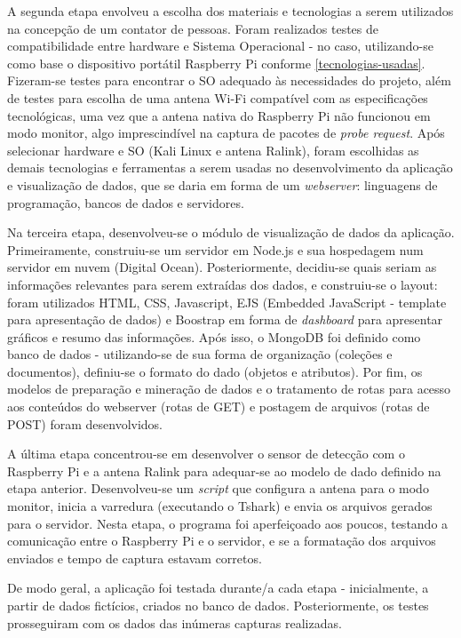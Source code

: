 A segunda etapa envolveu a escolha dos materiais e tecnologias a serem
utilizados na concepção de um contator de pessoas. Foram realizados testes de
compatibilidade entre hardware e Sistema Operacional - no caso, utilizando-se
como base o dispositivo portátil Raspberry Pi conforme
\autoref{tecnologias-usadas}. Fizeram-se testes para encontrar o SO adequado às
necessidades do projeto, além de testes para escolha de uma antena Wi-Fi
compatível com as especificações tecnológicas, uma vez que a antena nativa do
Raspberry Pi não funcionou em modo monitor, algo imprescindível na captura de
pacotes de \emph{probe request}. Após selecionar hardware e SO (Kali Linux e antena Ralink), foram escolhidas as demais
tecnologias e ferramentas a serem usadas no desenvolvimento da aplicação e
visualização de dados, que se daria em forma de um \emph{webserver}: linguagens
de programação, bancos de dados e servidores.

Na terceira etapa, desenvolveu-se o módulo de visualização de dados da aplicação.
Primeiramente, construiu-se um servidor em Node.js e sua hospedagem num servidor em nuvem (Digital Ocean). Posteriormente, decidiu-se quais seriam as informações relevantes para serem extraídas dos dados, e construiu-se o layout: foram utilizados HTML, CSS, Javascript, EJS (Embedded
JavaScript - template para apresentação de dados) e Boostrap em forma de
\emph{dashboard} para apresentar gráficos e resumo das informações. Após isso, o
MongoDB foi definido como banco de dados - utilizando-se de sua forma de
organização (coleções e documentos), definiu-se o formato do dado (objetos e
atributos). Por fim, os modelos de preparação e mineração  de dados e o
tratamento de rotas para acesso aos conteúdos do webserver (rotas de GET) e
postagem de arquivos (rotas de POST) foram desenvolvidos.

A última etapa concentrou-se em desenvolver o sensor de detecção com o
Raspberry Pi e a antena Ralink para adequar-se ao modelo de dado definido na
etapa anterior. Desenvolveu-se um \emph{script} que configura a antena para o
modo monitor, inicia a varredura (executando o Tshark) e envia os arquivos
gerados para o servidor. Nesta etapa, o programa foi aperfeiçoado aos poucos,
testando a comunicação entre o Raspberry Pi e o servidor, e se a formatação dos
arquivos enviados e tempo de captura estavam corretos.

De modo geral, a aplicação foi testada durante/a cada etapa - inicialmente,
a partir de dados fictícios, criados no banco de dados. Posteriormente, os testes
prosseguiram com os dados das inúmeras capturas realizadas.

